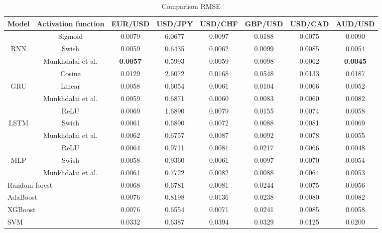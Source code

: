 \documentclass{ieeeaccess}
\begin{document}
\begin{table}[t]
  \caption{Comparison RMSE}
  \small
  \centering
  \begin{tabular*}{0.9\textwidth}{c @{\extracolsep{\fill}} ccccccc}
    \hline
    \textbf{Model} & \textbf{Activation function} & \textbf{EUR/USD} & \textbf{USD/JPY} & \textbf{USD/CHF} & \textbf{GBP/USD} & \textbf{USD/CAD} & \textbf{AUD/USD} \\
    \hline

           & Sigmoid & 0.0079 & 6.0677 & 0.0097 & 0.0188 & 0.0075 & 0.0090 \\
    RNN    & Swish & 0.0059 & 0.6435 & 0.0062 & 0.0099 & 0.0085 & 0.0054 \\
           & Munkhdalai et al. & \textbf{0.0057} & 0.5993 & 0.0059 & 0.0098 & 0.0062 & \textbf{0.0045} \\

    \hline

           & Cosine & 0.0129 & 2.6072 & 0.0168 & 0.0548 & 0.0133 & 0.0187 \\
    GRU    & Linear & 0.0058 & 0.6054 & 0.0061 & 0.0104 & 0.0066 & 0.0052 \\
           & Munkhdalai et al. & 0.0059 & 0.6871 & 0.0060 & 0.0083 & 0.0060 & 0.0082 \\

    \hline

           & ReLU & 0.0069 & 1.6890 & 0.0079 & 0.0155 & 0.0074 & 0.0058 \\
    LSTM   & Swish & 0.0061 & 0.6890 & 0.0072 & 0.0088 & 0.0081 & 0.0069 \\
           & Munkhdalai et al. & 0.0062 & 0.6757 & 0.0087 & 0.0092 & 0.0078 & 0.0055 \\
    
    \hline

           & ReLU & 0.0064 & 0.9711 & 0.0081 & 0.0217 & 0.0066 & 0.0048 \\
    MLP    & Swish & 0.0058 & 0.9360 & 0.0061 & 0.0097 & 0.0070 & 0.0054 \\
           & Munkhdalai et al. & 0.0061 & 0.7722 & 0.0082 & 0.0088 & 0.0064 & 0.0053 \\

    \hline

    \multicolumn{2}{l}{Random forest} & 0.0068 & 0.6781 & 0.0081 & 0.0244 & 0.0075 & 0.0056 \\
    \multicolumn{2}{l}{AdaBoost} & 0.0076 & 0.8198 & 0.0136 & 0.0238 & 0.0080 & 0.0082 \\
    \multicolumn{2}{l}{XGBoost} & 0.0076 & 0.6554 & 0.0071 & 0.0241 & 0.0085 & 0.0058 \\
    \multicolumn{2}{l}{SVM} & 0.0332 & 0.6387 & 0.0394 & 0.0329 & 0.0125 & 0.0200 \\


\end{tabular*}
\end{table}
\end{document}

